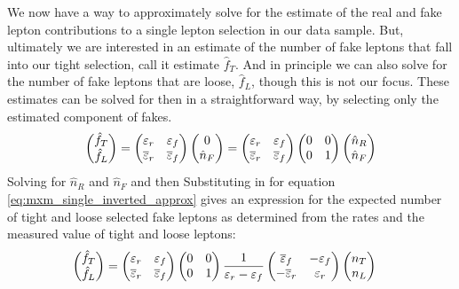 We now have a way to approximately solve for the estimate
of the real and fake lepton contributions to a single lepton 
selection in our data sample. But, ultimately we are interested
in an estimate of 
the number of fake leptons that fall into our tight selection, call it
estimate $\hat{f}_{T}$.
And in principle we can also solve for the number of fake leptons
that are loose, $\hat{f}_{L}$, though this is not our focus. 
These estimates can be solved for then in a straightforward way, by 
selecting only the estimated component of fakes.
\begin{equation}
  \begin{pmatrix} \hat{f}_T \\ \hat{f}_L \end{pmatrix} 
  =
  \begin{pmatrix}
  \varepsilon_r & \varepsilon_f \\ \overline{\varepsilon}_r & \overline{\varepsilon}_f
  \end{pmatrix} 
  \begin{pmatrix} 0\\ \hat{n}_F \end{pmatrix}
  =
  \begin{pmatrix}
  \varepsilon_r & \varepsilon_f \\ \overline{\varepsilon}_r & \overline{\varepsilon}_f
  \end{pmatrix} 
  \begin{pmatrix}
  0 & 0\\ 0 & 1
  \end{pmatrix} 
  \begin{pmatrix} \hat{n}_R\\ \hat{n}_F \end{pmatrix}
\end{equation}
Solving for $\hat{n}_R$ and $\hat{n}_F$ and then 
Substituting in for equation \eqn\eqref{eq:mxm_single_inverted_approx}
gives an expression for the expected number of tight and loose
selected fake leptons as determined from the rates and the measured
value of tight and loose leptons:
\begin{align}
  \label{eq:mxm_final_single}
  \begin{pmatrix} \hat{f}_T \\ \hat{f}_L \end{pmatrix} 
  &=
  \begin{pmatrix}
  \varepsilon_r & \varepsilon_f \\ \overline{\varepsilon}_r & \overline{\varepsilon}_f
  \end{pmatrix} 
  \begin{pmatrix}
  0 & 0\\ 0 & 1
  \end{pmatrix} 
  \frac{1}{\varepsilon_r-\varepsilon_f}
  \begin{pmatrix}
  \overline{\varepsilon}_f & -\varepsilon_f \\ -\overline{\varepsilon}_r& \varepsilon_r
  \end{pmatrix} 
  \begin{pmatrix} n_T\\ n_L \end{pmatrix}
\end{align}
